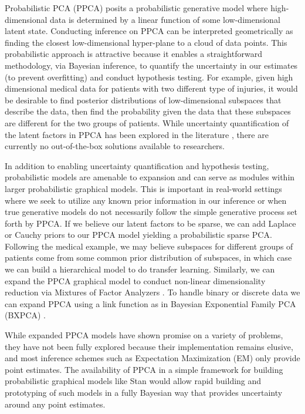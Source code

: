 \documentclass{article}
\begin{document}
Probabilistic PCA (PPCA) \citep{tipping1999probabilistic} posits a probabilistic generative model where high-dimensional data is determined by a linear function of some low-dimensional latent state. Conducting inference on PPCA can be interpreted geometrically as finding the closest low-dimensional hyper-plane to a cloud of data points. This probabilistic approach is attractive because it enables a straightforward methodology, via Bayesian inference, to quantify the uncertainty in our estimates (to prevent overfitting) and conduct hypothesis testing. For example, given high dimensional medical data for patients with two different type of injuries, it would be desirable to find posterior distributions of low-dimensional subspaces that describe the data, then find the probability given the data that these subspaces are different for the two groups of patients. While uncertainty quantification of the latent factors in PPCA has been explored in the literature \citep{hoff2009simulation,brubaker2012family, byrne2013geodesic}, there are currently no out-of-the-box solutions available to researchers. 

In addition to enabling uncertainty quantification and hypothesis testing, probabilistic models are amenable to expansion and can serve as modules within larger probabilistic graphical models. This is important in real-world settings where we seek to utilize any known prior information in our inference or when true generative models do not necessarily follow the simple generative process set forth by PPCA. If we believe our latent factors to be sparse, we can add Laplace or Cauchy priors to our PPCA model yielding a probabilistic sparse PCA\citep{zou2006sparse}. Following the medical example, we may believe subspaces for different groups of patients come from some common prior distribution of subspaces, in which case we can build a hierarchical model to do transfer learning. Similarly, we can expand the PPCA graphical model to conduct non-linear dimensionality reduction via Mixtures of Factor Analyzers \citep{ghahramani1996algorithm}. To handle binary or discrete data we can expand PPCA using a link function as in Bayesian Exponential Family PCA (BXPCA) \citep{mohamed2009bayesian}.

While expanded PPCA models have shown promise on a variety of problems, they have not been fully explored because their implementation remains elusive, and most inference schemes such as Expectation Maximization (EM) only provide point estimates. The availability of PPCA in a simple framework for building probabilistic graphical models like Stan \citep{carpenter2016stan} would allow rapid building and prototyping of such models in a fully Bayesian way that provides uncertainty around any point estimates.
\end{document}
